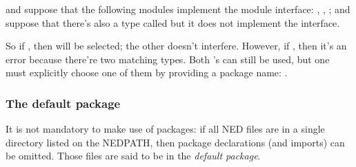 and suppose that the following modules implement the  module
interface: , ,
; and suppose that there's also a type
called  but it does not implement the
interface.

So if , then
 will be selected; the other
 doesn't interfere. However, if
, then it's an error because there're two
matching  types. Both 's can still be used,
but one must explicitly choose one of them by providing a package name:
.


\subsubsection{The default package}

It is not mandatory to make use of packages: if all NED files are in a
single directory listed on the NEDPATH, then package declarations (and
imports) can be omitted. Those files are said to be in the \textit{default
package}.






